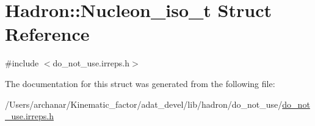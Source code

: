 \hypertarget{structHadron_1_1Nucleon__iso__t}{}\section{Hadron\+:\+:Nucleon\+\_\+iso\+\_\+t Struct Reference}
\label{structHadron_1_1Nucleon__iso__t}


{\ttfamily \#include $<$do\+\_\+not\+\_\+use.\+irreps.\+h$>$}



The documentation for this struct was generated from the following file\+:\begin{DoxyCompactItemize}
\item 
/\+Users/archanar/\+Kinematic\+\_\+factor/adat\+\_\+devel/lib/hadron/do\+\_\+not\+\_\+use/\mbox{\hyperlink{do__not__use_8irreps_8h}{do\+\_\+not\+\_\+use.\+irreps.\+h}}\end{DoxyCompactItemize}
